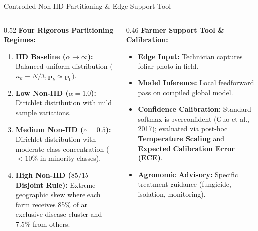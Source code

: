 \documentclass[aspectratio=169]{beamer}
\begin{document}
\begin{frame}{Controlled Non-IID Partitioning \& Edge Support Tool}
    \begin{columns}[T]
        \begin{column}{0.52\textwidth}
            \textbf{Four Rigorous Partitioning Regimes:}
            \begin{enumerate}
                \item \textbf{IID Baseline ($\alpha \to \infty$):} Balanced uniform distribution ($n_k = N/3, \mathbf{p}_k \approx \mathbf{p}_0$).
                \item \textbf{Low Non-IID ($\alpha = 1.0$):} Dirichlet distribution with mild sample variations.
                \item \textbf{Medium Non-IID ($\alpha = 0.5$):} Dirichlet distribution with moderate class concentration ($<10\%$ in minority classes).
                \item \textbf{High Non-IID ($85/15$ Disjoint Rule):} Extreme geographic skew where each farm receives 85\% of an exclusive disease cluster and 7.5\% from others.
            \end{enumerate}
        \end{column}
        \begin{column}{0.46\textwidth}
            \textbf{Farmer Support Tool \& Calibration:}
            \begin{itemize}
                \item \textbf{Edge Input:} Technician captures foliar photo in field.
                \item \textbf{Model Inference:} Local feedforward pass on compiled global model.
                \item \textbf{Confidence Calibration:} Standard softmax is overconfident (Guo et al., 2017); evaluated via post-hoc \textbf{Temperature Scaling} and \textbf{Expected Calibration Error (ECE)}.
                \item \textbf{Agronomic Advisory:} Specific treatment guidance (fungicide, isolation, monitoring).
            \end{itemize}
        \end{column}
    \end{columns}
\end{frame}
\end{document}
